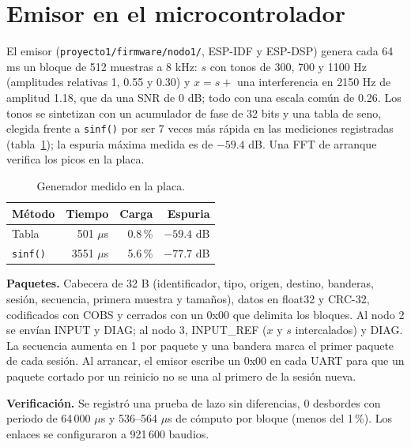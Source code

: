 \documentclass[10pt,a4paper,twocolumn]{article}
\newcommand{\ruta}[1]{\nolinkurl{#1}}
\begin{document}
\section{Emisor en el microcontrolador}\label{sec:emisor}
El emisor (\ruta{proyecto1/firmware/nodo1/}, ESP-IDF y ESP-DSP) genera cada 64 ms un bloque de 512 muestras a 8 kHz: $s$ con tonos de 300, 700 y 1100 Hz (amplitudes relativas 1, 0.55 y 0.30) y $x = s +$ una interferencia en 2150 Hz de amplitud 1.18, que da una SNR de 0 dB; todo con una escala común de 0.26. Los tonos se sintetizan con un acumulador de fase de 32 bits y una tabla de seno, elegida frente a \ruta{sinf()} por ser 7 veces más rápida en las mediciones registradas (tabla~\ref{tab:generador}); la espuria máxima medida es de $-59.4$ dB. Una FFT de arranque verifica los picos en la placa.
\begin{table}[!t]\centering\caption{Generador medido en la placa.}\label{tab:generador}\small
\begin{tabular}{lrrr}\toprule Método & Tiempo & Carga & Espuria\\\midrule
Tabla & 501 $\mu$s & 0.8\,\% & $-59.4$ dB\\
\ruta{sinf()} & 3551 $\mu$s & 5.6\,\% & $-77.7$ dB\\\bottomrule\end{tabular}\end{table}

\textbf{Paquetes.} Cabecera de 32 B (identificador, tipo, origen, destino, banderas, sesión, secuencia, primera muestra y tamaños), datos en float32 y CRC-32\cite{zlib}, codificados con COBS\cite{cobs} y cerrados con un 0x00 que delimita los bloques. Al nodo 2 se envían INPUT y DIAG; al nodo 3, INPUT\_REF ($x$ y $s$ intercalados) y DIAG. La secuencia aumenta en 1 por paquete y una bandera marca el primer paquete de cada sesión. Al arrancar, el emisor escribe un 0x00 en cada UART para que un paquete cortado por un reinicio no se una al primero de la sesión nueva.

\textbf{Verificación.} Se registró una prueba de lazo sin diferencias, 0 desbordes con periodo de 64\,000 $\mu$s y 536--564 $\mu$s de cómputo por bloque (menos del 1\,\%). Los enlaces se configuraron a 921\,600 baudios.

\end{document}
